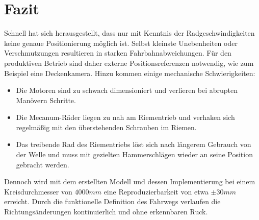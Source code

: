 \section{Fazit}
Schnell hat sich herausgestellt, dass nur mit Kenntnis der Radgeschwindigkeiten keine genaue Positionierung möglich ist. Selbst kleinste Unebenheiten oder Verschmutzungen resultieren in starken Fahrbahnabweichungen. Für den produktiven Betrieb sind daher externe Positionsreferenzen notwendig, wie zum Beispiel eine Deckenkamera. Hinzu kommen einige mechanische Schwierigkeiten:

\begin{itemize}
    \item Die Motoren sind zu schwach dimensioniert und verlieren bei abrupten Manövern Schritte.
    \item Die Mecanum-Räder liegen zu nah am Riementrieb und verhaken sich regelmäßig mit den überstehenden Schrauben im Riemen.
    \item Das treibende Rad des Riementriebs löst sich nach längerem Gebrauch von der Welle und muss mit gezielten Hammerschlägen wieder an seine Position gebracht werden.
\end{itemize}

Dennoch wird mit dem erstellten Modell und dessen Implementierung bei einem Kreisdurchmesser von $4000 mm$ eine Reproduzierbarkeit von etwa $\pm 30 mm$ erreicht.
Durch die funktionelle Definition des Fahrwegs verlaufen die Richtungsänderungen kontinuierlich und ohne erkennbaren Ruck.
